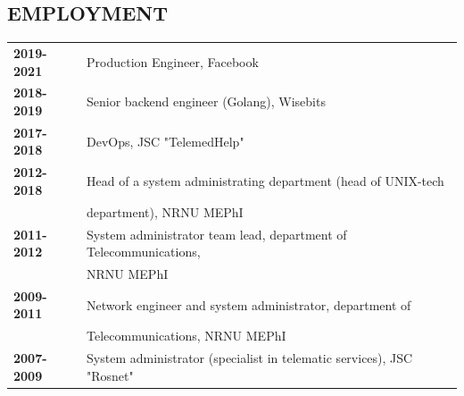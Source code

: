 \begin{resume}
\section{EMPLOYMENT}
\vspace{0.1in} 
\begin{tabular}{ll}
    {\bf 2019-2021} & Production Engineer, Facebook\\
    {\bf 2018-2019} & Senior backend engineer (Golang), Wisebits\\
    {\bf 2017-2018} & DevOps, JSC "TelemedHelp"\\
    {\bf 2012-2018} & Head of a system administrating department (head of UNIX-tech\\
                    & department), NRNU MEPhI\\
    {\bf 2011-2012} & System administrator team lead, department of Telecommunications,\\
                    & NRNU MEPhI\\
    {\bf 2009-2011} & Network engineer and system administrator, department of \\
                    & Telecommunications, NRNU MEPhI\\
    {\bf 2007-2009} & System administrator (specialist in telematic services), JSC "Rosnet"\\
\end{tabular}


\end{resume}
